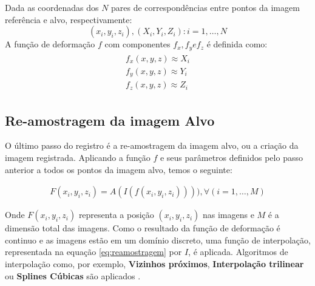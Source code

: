   Dada as coordenadas dos $N$ pares de correspondências entre pontos da imagem
referência e alvo, respectivamente:
\begin{equation}
  {(x_i, y_i, z_i), (X_i, Y_i, Z_i) : i = 1, \dots, N}
\end{equation}
  A função de deformação $f$ com componentes $f_x, f_y e f_z$ é definida como:
\begin{align}
  \begin{split}
    f_x(x, y, z) \approx X_i \\
    f_y(x, y, z) \approx Y_i \\
    f_z(x, y, z) \approx Z_i
  \end{split}
\end{align}

\subsection{Re-amostragem da imagem Alvo}

  O último passo do registro é a re-amostragem da imagem alvo, ou a criação
da imagem registrada. Aplicando a função $f$ e seus parâmetros definidos pelo
passo anterior a todos os pontos da imagem alvo, temos o seguinte:

\begin{align}\label{eq:reamostragem}
    F(x_i, y_i, z_i) = A(I(f(x_i, y_i, z_i)))), \forall (i = 1, \dots, M)
\end{align}

  Onde $F(x_i, y_i, z_i)$ representa a posição $(x_i, y_i, z_i)$ nas imagens e
$M$ é a dimensão total das imagens.
  Como o resultado da função de deformação é continuo e as imagens estão em um
domínio discreto, uma função de interpolação, representada na equação \ref{eq:reamostragem}
por $I$, é aplicada. Algoritmos de interpolação como, por exemplo,
\textbf{Vizinhos próximos}, \textbf{Interpolação trilinear} ou \textbf{Splines Cúbicas}
são aplicados \cite{lehmann1999survey}.
